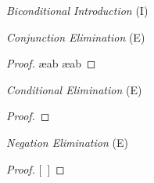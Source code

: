 \begin{multicols}{2}
\textit{Biconditional Introduction} (\eiff I) \vspace{-1em}

\begin{fitchproof}
	\open
		 
	\close
\breakline
	\open
		 
	\close
\end{fitchproof}

\iffalse %
\begin{proof}
	\have[m]{ab}{\metaA{}\eif\metaB{}}
	\have[n]{ba}{\metaB{}\eif\metaA{}}
	\have[\ ]{c}{\metaA{}\eiff\metaB{}} \bi{ab, ba}
\end{proof}
\fi 

\vfill\null
\columnbreak


\textit{Conjunction Elimination} (\eand E) \vspace{-1em}

\begin{proof}
	 \ae{ab}
	 \ae{ab}
\end{proof}

\vspace{0.75em}

\textit{Conditional Elimination} (\eif E)  \vspace{-1em}

\begin{proof}
	 
\end{proof}

\vspace{0.45em}

\textit{Negation Elimination} (\enot E)  \vspace{-1em}

\begin{proof}
\open
	 
	\metaB{}
	\ellipsesline
\close
{}[\ ]\metaA{}
\end{proof}

\vspace{1em}


\end{multicols}
